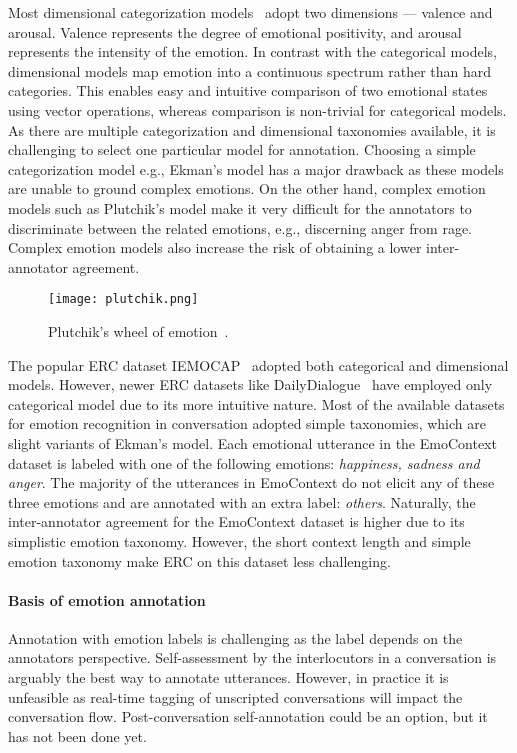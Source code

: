 \documentclass{IEEEtran}\usepackage[pdftex]{graphicx}
\begin{document}
	Most dimensional categorization models~\citep{jamesrussel,Mehrabian1996} adopt two dimensions
	--- valence and arousal. Valence represents the degree of emotional positivity, and arousal represents the intensity of the emotion. In contrast with
	the categorical models, dimensional
	models map emotion into a continuous spectrum rather than hard categories. This enables easy and intuitive comparison of two emotional states using vector operations, whereas comparison is non-trivial for categorical models. As there are multiple categorization and dimensional taxonomies available, it is challenging to select one particular model for annotation. Choosing a simple categorization model e.g., Ekman's model has a major drawback as these models are unable to ground complex emotions. On the other hand, complex emotion models such as Plutchik's model make it very difficult for the annotators to discriminate between the related emotions, e.g., discerning anger from rage. Complex emotion models also increase the risk of obtaining a lower inter-annotator agreement.
	
	\begin{figure}
		\centering
		\texttt{[image: plutchik.png]}
		\caption{Plutchik's wheel of emotion~\citep{plutchik}.}
		\label{fig:plutchik}
	\end{figure}
	
	The popular ERC dataset IEMOCAP~\citep{busso2008iemocap} adopted both
	categorical and dimensional models. However, newer ERC datasets like
	DailyDialogue~\citep{li2017dailydialog} have employed only categorical model due to its more 
	intuitive nature. Most of the available datasets for emotion recognition in conversation adopted simple taxonomies, which are slight variants of Ekman's model. Each emotional utterance in the EmoContext dataset is labeled with one of the following emotions: \emph{happiness, sadness and anger}. The majority of the utterances in EmoContext do not elicit any of these three emotions and are annotated with an extra label: \emph{others}. Naturally, the inter-annotator agreement for the EmoContext dataset is higher due to its simplistic emotion taxonomy. However, the short context length and simple emotion taxonomy make ERC on this dataset less challenging.
	
	\paragraph{Basis of emotion annotation} 


	Annotation with emotion labels is challenging as the label depends on the annotators
	perspective. Self-assessment by the interlocutors in a conversation is arguably
	the best
	way to annotate utterances. However, in practice it is unfeasible as real-time 
	tagging of unscripted conversations will impact the conversation flow.
	Post-conversation self-annotation could be an option, but it has not been done yet.
	
\end{document}
